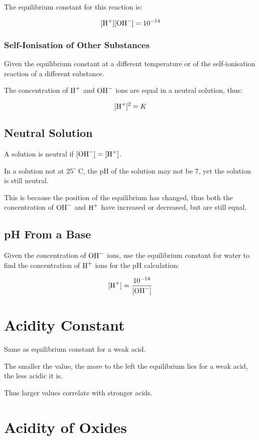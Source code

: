 \documentclass[a4paper,11pt]{article}
\begin{document}
The equilibrium constant for this reaction is:

$$
[\ce{H+}][\ce{OH-}] = 10^{-14}
$$


\subsubsection{Self-Ionisation of Other Substances}

Given the equilibrium constant at a different temperature or of the
self-ionisation reaction of a different substance.

The concentration of $\ce{H+}$ and $\ce{OH-}$ ions are equal in a neutral
solution, thus:

$$
[\ce{H+}]^2 = K
$$


\subsection{Neutral Solution}

A solution is neutral if $[\ce{OH-}] = [\ce{H+}]$.

In a solution not at $25^\circ\mbox{ C}$, the pH of the solution may not be 7,
yet the solution is still neutral.

This is because the position of the equilibrium has changed, thus both the
concentration of $\ce{OH-}$ and $\ce{H+}$ have increased or decreased, but are
still equal.


\subsection{pH From a Base}

Given the concentration of $\ce{OH-}$ ions, use the equilibrium constant for
water to find the concentration of $\ce{H+}$ ions for the pH calculation:

$$
[\ce{H+}] = \frac{10^{-14}}{[\ce{OH-}]}
$$


\section{Acidity Constant}

Same as equilibrium constant for a weak acid.

The smaller the value, the more to the left the equilibrium lies for a weak
acid, the less acidic it is.

Thus larger values correlate with stronger acids.


\section{Acidity of Oxides}
\end{document}
